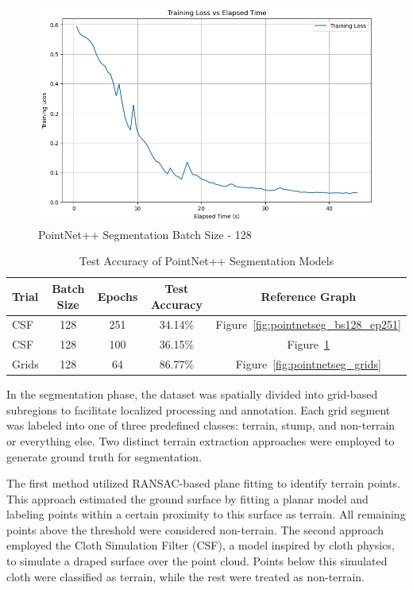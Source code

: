 \documentclass[../report.tex]{subfiles}
\begin{document}
\begin{figure}
    \centering
    \includegraphics[width=0.7\linewidth]{rnd-project-report-main/figures/PointNetSeg_bs128.png}
    \caption{PointNet++ Segmentation Batch Size - 128}
    \label{fig:pointnetseg_bs128}
\end{figure}


\begin{table}[h!]
\centering
\caption{Test Accuracy of PointNet++ Segmentation Models}
\begin{tabular}{|l|c|c|c|c|}
\hline
\textbf{Trial} & \textbf{Batch Size} & \textbf{Epochs} & \textbf{Test Accuracy} & \textbf{Reference Graph} \\
\hline
CSF & 128 & 251 & 34.14\% & Figure~\ref{fig:pointnetseg_bs128_ep251} \\
CSF & 128 & 100   & 36.15\% & Figure~\ref{fig:pointnetseg_bs128} \\
Grids & 128   & 64   & 86.77\% & Figure~\ref{fig:pointnetseg_grids} \\

\hline
\end{tabular}
\label{tab:pointnet_results}
\end{table}

In the segmentation phase, the dataset was spatially divided into grid-based subregions to facilitate localized processing and annotation. Each grid segment was labeled into one of three predefined classes: terrain, stump, and non-terrain or everything else. Two distinct terrain extraction approaches were employed to generate ground truth for segmentation.

The first method utilized RANSAC-based plane fitting to identify terrain points. This approach estimated the ground surface by fitting a planar model and labeling points within a certain proximity to this surface as terrain. All remaining points above the threshold were considered non-terrain. The second approach employed the Cloth Simulation Filter (CSF), a model inspired by cloth physics, to simulate a draped surface over the point cloud. Points below this simulated cloth were classified as terrain, while the rest were treated as non-terrain.
\end{document}
